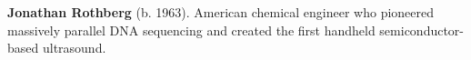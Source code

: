 \textbf{Jonathan Rothberg} (b. 1963). American chemical engineer who pioneered massively parallel DNA sequencing and created the first handheld semiconductor-based ultrasound.

